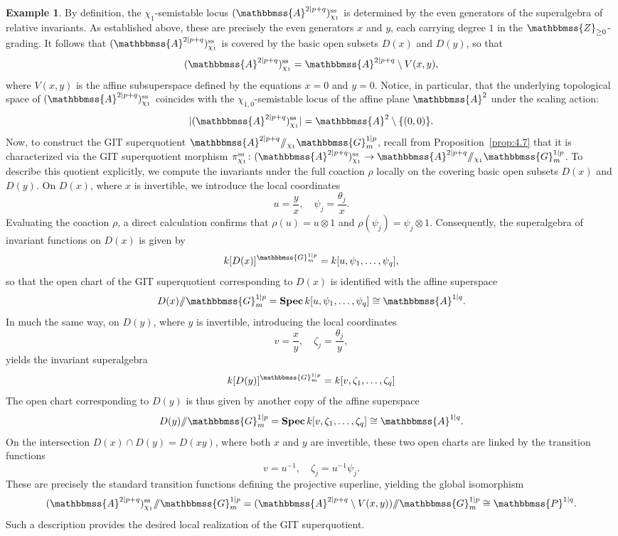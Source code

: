 \documentclass[11pt,a4paper,reqno,noamsfonts]{amsart}
\numberwithin{equation}{section}
\theoremstyle{definition}
\newtheorem{example}[theorem]{Example}
\theoremstyle{remark}
\renewcommand{\AA}{\ensuremath{\mathbbmss{A}}}
\newcommand{\GG}{\ensuremath{\mathbbmss{G}}}
\newcommand{\PP}{\ensuremath{\mathbbmss{P}}}
\newcommand{\ZZ}{\ensuremath{\mathbbmss{Z}}}
\newcommand{\uss}{\ensuremath{\mathrm{ss}}}
\DeclareMathOperator{\sSpec}{\mathbf{Spec}}
\begin{document}
\begin{example}
By definition, the $\chi_1$-semistable locus $(\AA^{2 \vert p+q})^{\uss}_{\chi_1}$ is determined by the even generators of the superalgebra of relative invariants. As established above, these are precisely the even generators $x$ and $y$, each carrying degree $1$ in the $\ZZ_{\geq 0}$-grading. It follows that $(\AA^{2 \vert p+q})^{\uss}_{\chi_1}$ is covered by the basic open subsets $D(x)$ and $D(y)$, so that
$$
(\AA^{2 \vert p+q})^{\uss}_{\chi_1} = \AA^{2 \vert p+q} \setminus V(x,y),
$$
where $V(x,y)$ is the affine subsuperspace defined by the equations $x=0$ and $y=0$. Notice, in particular, that the underlying topological space of $(\AA^{2 \vert p+q})^{\uss}_{\chi_1}$ coincides with the $\chi_{1,0}$-semistable locus of the affine plane $\AA^2$ under the scaling action:
$$
\lvert (\AA^{2 \vert p+q})^{\uss}_{\chi_1} \rvert = \AA^2 \setminus \{(0,0)\}.
$$
Now, to construct the GIT superquotient $\AA^{2 \vert p+q} {\sslash_{\chi_1}} \GG_m^{1 \vert p}$, recall from Proposition~\ref{prop:4.7} that it is characterized via the GIT superquotient morphism $\pi^{\uss}_{\chi_1} \colon (\AA^{2 \vert p+q})^{\uss}_{\chi_1} \to \AA^{2 \vert p+q} {\sslash_{\chi_1}} \GG_m^{1 \vert p}$. To describe this quotient explicitly, we compute the invariants under the full coaction $\rho$ locally on the covering basic open subsets $D(x)$ and $D(y)$.  On $D(x)$, where $x$ is invertible, we introduce the local coordinates
$$
u = \frac{y}{x}, \quad \psi_j = \frac{\theta_j}{x}.
$$
Evaluating the coaction $\rho$, a direct calculation confirms that $\rho(u) = u \otimes 1$ and $\rho(\psi_j) = \psi_j \otimes 1$. Consequently, the superalgebra of invariant functions on $D(x)$ is given by
$$
k[D(x)]^{\GG_m^{1 \vert p}} = k[u,\psi_1,\dots,\psi_q],
$$
so that the open chart of the GIT superquotient corresponding to $D(x)$ is identified with the affine superspace
$$
D(x) {\sslash} \GG_m^{1 \vert p} = \sSpec k[u,\psi_1,\dots,\psi_q] \cong \AA^{1 \vert q}.
$$
In much the same way, on $D(y)$, where $y$ is invertible, introducing the local coordinates
$$
v = \frac{x}{y}, \quad \zeta_j = \frac{\theta_j}{y},
$$
yields the invariant superalgebra
$$
k[D(y)]^{\GG_m^{1 \vert p}} = k[v,\zeta_1,\dots,\zeta_q]
$$
The open chart corresponding to $D(y)$ is thus given by another copy of the affine superspace
$$
D(y) {\sslash} \GG_m^{1 \vert p} = \sSpec k[v,\zeta_1,\dots,\zeta_q] \cong \AA^{1 \vert q}.
$$
On the intersection $D(x) \cap D(y) = D(xy)$, where both $x$ and $y$ are invertible, these two open charts are linked by the transition functions
$$
v = u^{-1}, \quad \zeta_j = u^{-1} \psi_j.
$$
These are precisely the standard transition functions defining the projective superline, yielding the global isomorphism
$$
(\AA^{2 \vert p+q})^{\uss}_{\chi_1} {\sslash} \GG_m^{1 \vert p} = (\AA^{2 \vert p+q} \setminus V(x,y)) {\sslash} \GG_m^{1 \vert p} \cong \PP^{1 \vert q}.
$$
Such a description provides the desired local realization of the GIT superquotient.
\end{example}
\end{document}
